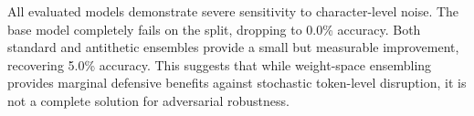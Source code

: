 All evaluated models demonstrate severe sensitivity to character-level noise. The base model completely fails on the \adv split, dropping to 0.0\% accuracy. Both standard and antithetic ensembles provide a small but measurable improvement, recovering 5.0\% accuracy. This suggests that while weight-space ensembling provides marginal defensive benefits against stochastic token-level disruption, it is not a complete solution for adversarial robustness.